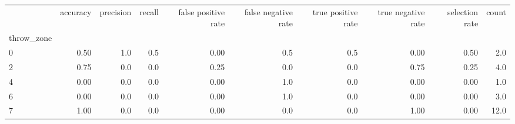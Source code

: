 \begin{tabular}{lrrrrrrrrr}
\toprule
{} &  accuracy &  precision &  recall &  false positive rate &  false negative rate &  true positive rate &  true negative rate &  selection rate &  count \\
throw\_zone &           &            &         &                      &                      &                     &                     &                 &        \\
\midrule
0          &      0.50 &        1.0 &     0.5 &                 0.00 &                  0.5 &                 0.5 &                0.00 &            0.50 &    2.0 \\
2          &      0.75 &        0.0 &     0.0 &                 0.25 &                  0.0 &                 0.0 &                0.75 &            0.25 &    4.0 \\
4          &      0.00 &        0.0 &     0.0 &                 0.00 &                  1.0 &                 0.0 &                0.00 &            0.00 &    1.0 \\
6          &      0.00 &        0.0 &     0.0 &                 0.00 &                  1.0 &                 0.0 &                0.00 &            0.00 &    3.0 \\
7          &      1.00 &        0.0 &     0.0 &                 0.00 &                  0.0 &                 0.0 &                1.00 &            0.00 &   12.0 \\
\bottomrule
\end{tabular}
